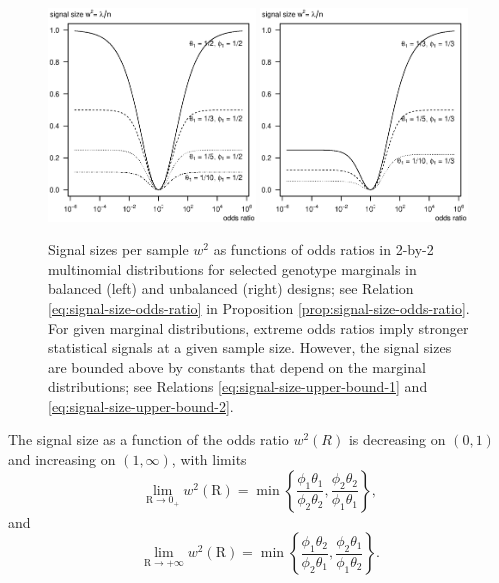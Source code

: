 \begin{figure}
      \centering
      \includegraphics[width=0.49\textwidth]{pics/singal-vs-odds-p05}
      \includegraphics[width=0.49\textwidth]{pics/singal-vs-odds-p0333}            
      \caption{Signal sizes per sample $w^2$ as functions of odds ratios in 2-by-2 multinomial distributions for selected genotype marginals in balanced (left) and unbalanced (right) designs; see Relation \eqref{eq:signal-size-odds-ratio} in Proposition \ref{prop:signal-size-odds-ratio}. For given marginal distributions, extreme odds ratios imply stronger statistical signals at a given sample size. However, the signal sizes are bounded above by constants that depend on the marginal distributions; see Relations \eqref{eq:signal-size-upper-bound-1} and \eqref{eq:signal-size-upper-bound-2}. %
      } 
      \label{fig:signal-vs-odds}
\end{figure}

\begin{corollary} \label{cor:signal-limits-OR}
The signal size as a function of the odds ratio $w^2(R)$ is decreasing on $(0,1)$ and increasing on $(1,\infty)$, with limits
\begin{equation} \label{eq:signal-size-upper-bound-1}
    \lim_{\text{R}\to0_+} w^2(\text{R}) = \min\left\{\frac{\phi_1\theta_1}{\phi_2\theta_2}, \frac{\phi_2\theta_2}{\phi_1\theta_1}\right\},
\end{equation}
and
\begin{equation} \label{eq:signal-size-upper-bound-2}
    \lim_{\text{R}\to+\infty} w^2(\text{R}) = \min\left\{\frac{\phi_1\theta_2}{\phi_2\theta_1}, \frac{\phi_2\theta_1}{\phi_1\theta_2}\right\}.
\end{equation}
\end{corollary}

